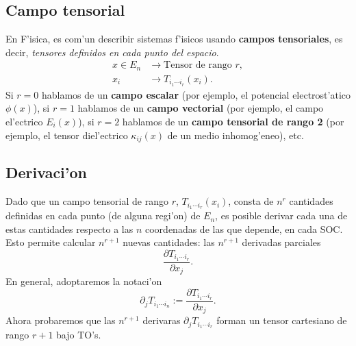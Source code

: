 \subsection{Campo tensorial}
En F'isica, es com'un describir sistemas f'isicos usando \textbf{campos tensoriales}, es decir, \textit{tensores definidos en cada punto del espacio}.
\begin{align}
x\in E_n & \rightarrow \text{Tensor de rango\ } r, \\
x_i & \rightarrow T_{i_1\cdots i_r}(x_i).
\end{align}
Si $r=0$ hablamos de un \textbf{campo escalar} (por ejemplo, el potencial electrost'atico $\phi(x)$), si $r=1$ hablamos de un \textbf{campo vectorial} (por ejemplo, el campo el'ectrico $E_i(x)$), si $r=2$ hablamos de un \textbf{campo tensorial de rango 2} (por ejemplo, el tensor diel'ectrico $\kappa_{ij}(x)$ de un medio inhomog'eneo), etc.

\subsection{Derivaci'on}
Dado que un campo tensorial de rango $r$,  $T_{i_1\cdots i_r}(x_i)$, consta de $n^r$ cantidades definidas en cada punto (de alguna regi'on) de $E_n$, es posible derivar cada una de estas cantidades respecto a las $n$ coordenadas de las que depende, en cada SOC. Esto permite calcular $n^{r+1}$ nuevas cantidades: las $n^{r+1}$ derivadas parciales
\begin{equation}
\frac{\partial T_{i_1\cdots i_r}}{\partial x_j}.
\end{equation}
En general, adoptaremos la notaci'on
\begin{equation}
\partial_jT_{i_1\cdots i_n}:= \frac{\partial T_{i_1\cdots i_r}}{\partial x_j}.
\end{equation}
Ahora probaremos que las $n^{r+1}$ derivaras $\partial_jT_{i_1\cdots i_r}$ forman un tensor cartesiano de rango $r+1$ bajo TO's.

